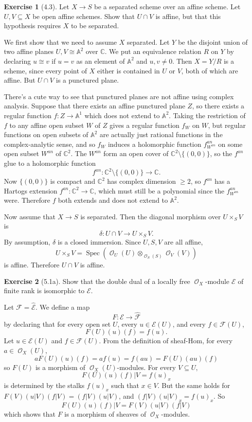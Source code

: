 \documentclass[10pt]{article}
\newcommand{\CC}{\mathbb{C}}
\newcommand{\Aff}{\mathbb A}
\newcommand{\Spec}{\operatorname{Spec}}
\DeclareMathOperator{\Olo}{\mathscr O}
\theoremstyle{definition}
\newtheorem{exer}{Exercise}
\begin{document}
\begin{exer}[4.3]
Let $X \to S$ be a separated scheme over an affine scheme.
Let $U, V \subseteq X$ be open affine schemes.
Show that $U \cap V$ is affine, but that this hypothesis requires $X$ to be separated.
\end{exer}

We first show that we need to assume $X$ separated.
Let $Y$ be the disjoint union of two affine planes $U, V \cong \Aff^2$ over $\CC$.
We put an equivalence relation $R$ on $Y$ by declaring $u \cong v$ if $u = v$ as an element of $\Aff^2$ and $u,v \neq 0$.
Then $X = Y/R$ is a scheme, since every point of $X$ either is contained in $U$ or $V$, both of which are affine.
But $U \cap V$ is a punctured plane.

There's a cute way to see that punctured planes are not affine using complex analysis.
Suppose that there exists an affine punctured plane $Z$, so there exists a regular function $f: Z \to \Aff^1$ which does not extend to $\Aff^2$.
Taking the restriction of $f$ to any affine open subset $W$ of $Z$ gives a regular function $f_W$ on $W$, but regular functions on open subsets of $\Aff^2$ are actually just rational functions in the complex-analytic sense, and so $f_W$ induces a holomorphic function $f^{an}_{W^{an}}$ on some open subset $W^{an}$ of $\CC^2$.
The $W^{an}$ form an open cover of $\CC^2 \setminus \{(0, 0)\}$, so the $f^{an}$ glue to a holomorphic function
$$f^{an}: \CC^2 \setminus \{(0, 0)\} \to \CC.$$
Now $\{(0, 0)\}$ is compact and $\CC^2$ has complex dimension $\geq 2$, so $f^{an}$ has a Hartogs extension $f^{an}: \CC^2 \to \CC$, which must still be a polynomial since the $f^{an}_{W^{an}}$ were.
Therefore $f$ both extends and does not extend to $\Aff^2$.

Now assume that $X \to S$ is separated.
Then the diagonal morphism over $U \times_S V$ is
$$\delta: U \cap V \to U \times_S V.$$
By assumption, $\delta$ is a closed immersion. Since $U,S,V$ are all affine,
$$U \times_S V = \Spec(\Olo_U(U) \otimes_{\Olo_S(S)} \Olo_V(V))$$
is affine. Therefore $U \cap V$ is affine.

\begin{exer}[5.1a]
Show that the double dual of a locally free $\Olo_X$-module $\mathscr E$ of finite rank is isomorphic to $\mathscr E$.
\end{exer}

Let $\mathscr F = \widehat{\mathscr E}$.
We define a map
$$F: \mathscr E \to \widehat{\mathscr F}$$
by declaring that for every open set $U$, every $u \in \mathscr E(U)$, and every $f \in \mathscr F(U)$,
$$F(U)(u)(f) = f(u).$$
Let $u \in \mathscr E(U)$ and $f \in \mathscr F(U)$.
From the definition of sheaf-Hom, for every $a \in \Olo_X(U)$,
$$aF(U)(u)(f) = af(u) = f(au) = F(U)(au)(f)$$
so $F(U)$ is a morphism of $\Olo_X(U)$-modules.
For every $V \subseteq U$,
$$F(U)(u)(f)|V = f(u)_x$$
is determined by the stalks $f(u)_x$ such that $x \in V$.
But the same holds for $F(V)(u|V)(f|V) = (f|V)(u|V)$, and $(f|V)(u|V)_x = f(u)_x$.
So
$$F(U)(u)(f)|V = F(V)(u|V)(f|V)$$
which shows that $F$ is a morphism of sheaves of $\Olo_X$-modules.
\end{document}
